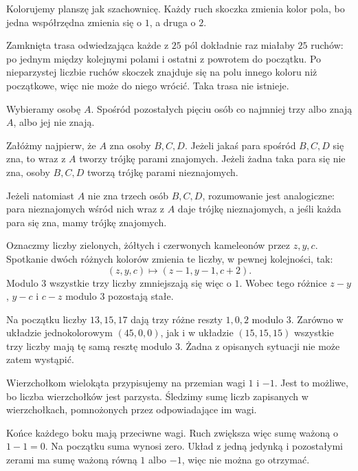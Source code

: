 \documentclass{lecture-kuznia}
\begin{document}
\begin{solution*}[\ref{Z10}]
	Kolorujemy planszę jak szachownicę. Każdy ruch skoczka zmienia kolor pola,
	bo jedna współrzędna zmienia się o $1$, a druga o $2$.

	Zamknięta trasa odwiedzająca każde z $25$ pól dokładnie raz miałaby
	$25$ ruchów: po jednym między kolejnymi polami i ostatni z powrotem do
	początku. Po nieparzystej liczbie ruchów skoczek znajduje się na polu
	innego koloru niż początkowe, więc nie może do niego wrócić. Taka trasa
	nie istnieje.
\end{solution*}

\begin{solution*}[\ref{Z11}]
	Wybieramy osobę $A$. Spośród pozostałych pięciu osób co najmniej trzy
	albo znają $A$, albo jej nie znają.

	Załóżmy najpierw, że $A$ zna osoby $B,C,D$. Jeżeli jakaś para spośród
	$B,C,D$ się zna, to wraz z $A$ tworzy trójkę parami znajomych. Jeżeli
	żadna taka para się nie zna, osoby $B,C,D$ tworzą trójkę parami
	nieznajomych.

	Jeżeli natomiast $A$ nie zna trzech osób $B,C,D$, rozumowanie jest
	analogiczne: para nieznajomych wśród nich wraz z $A$ daje trójkę
	nieznajomych, a jeśli każda para się zna, mamy trójkę znajomych.
\end{solution*}

\begin{solution*}[\ref{Z12}]
	Oznaczmy liczby zielonych, żółtych i czerwonych kameleonów przez $z,y,c$.
	Spotkanie dwóch różnych kolorów zmienia te liczby, w pewnej kolejności,
	tak:
	\[
		(z,y,c)\longmapsto(z-1,y-1,c+2).
	\]
	Modulo $3$ wszystkie trzy liczby zmniejszają się więc o $1$. Wobec tego
	różnice $z-y$, $y-c$ i $c-z$ modulo $3$ pozostają stałe.

	Na początku liczby $13,15,17$ dają trzy różne reszty $1,0,2$ modulo $3$.
	Zarówno w układzie jednokolorowym $(45,0,0)$, jak i w układzie
	$(15,15,15)$ wszystkie trzy liczby mają tę samą resztę modulo $3$.
	Żadna z opisanych sytuacji nie może zatem wystąpić.
\end{solution*}

\begin{solution*}[\ref{Z13}]
	Wierzchołkom wielokąta przypisujemy na przemian wagi $1$ i $-1$. Jest to
	możliwe, bo liczba wierzchołków jest parzysta. Śledzimy sumę liczb
	zapisanych w wierzchołkach, pomnożonych przez odpowiadające im wagi.

	Końce każdego boku mają przeciwne wagi. Ruch zwiększa więc sumę ważoną o
	$1-1=0$. Na początku suma wynosi zero. Układ z jedną jedynką i pozostałymi
	zerami ma sumę ważoną równą $1$ albo $-1$, więc nie można go otrzymać.
\end{solution*}
\end{document}
